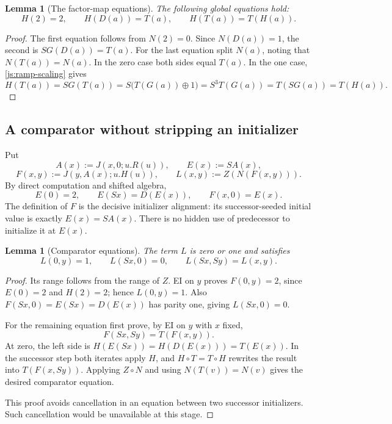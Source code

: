 \documentclass[11pt,letterpaper]{article}
\newtheorem{lemma}[theorem]{Lemma}
\theoremstyle{definition}\newtheorem{definition}[theorem]{Definition}
\theoremstyle{remark}\newtheorem{remark}[theorem]{Remark}
\begin{document}
\begin{lemma}[The factor-map equations]\label{js:factor}
The following global equations hold:
\[
 H(2)=2,\qquad H(D(a))=T(a),\qquad H(T(a))=T(H(a)).
 \tag{Factor}\label{js:factor-equations}
\]
\end{lemma}
\begin{proof}
The first equation follows from $N(2)=0$.  Since $N(D(a))=1$,
the second is $S G(D(a))=T(a)$.
For the last equation split $N(a)$, noting that $N(T(a))=N(a)$.
In the zero case both sides equal $T(a)$.  In the one case,
\eqref{js:ramp-scaling} gives
\[
 H(T(a))=S G(T(a))
 =S\bigl(T(G(a))\oplus1\bigr)
 =S^3T(G(a))=T(SG(a))=T(H(a)).
\]
\end{proof}

\subsection{A comparator without stripping an initializer}

Put
\[
 A(x):=J(x,0;u.R(u)),\qquad E(x):=S A(x),
\]
\[
 F(x,y):=J(y,A(x);u.H(u)),\qquad
 L(x,y):=Z(N(F(x,y))).
\]
By direct computation and shifted algebra,
\[
 E(0)=2,\qquad E(Sx)=D(E(x)),\qquad F(x,0)=E(x).
\]
The definition of $F$ is the decisive initializer alignment:
its successor-seeded initial value is exactly $E(x)=S A(x)$.
There is no hidden use of predecessor to initialize it at $E(x)$.

\begin{lemma}[Comparator equations]\label{js:comparator}
The term $L$ is zero or one and satisfies
\[
 L(0,y)=1,\qquad L(Sx,0)=0,\qquad
 L(Sx,Sy)=L(x,y).
 \tag{Comparator}\label{js:comparator-equations}
\]
\end{lemma}
\begin{proof}
Its range follows from the range of $Z$.  EI on $y$ proves
$F(0,y)=2$, since $E(0)=2$ and $H(2)=2$; hence $L(0,y)=1$.
Also $F(Sx,0)=E(Sx)=D(E(x))$ has parity one, giving
$L(Sx,0)=0$.

For the remaining equation first prove, by EI on $y$ with $x$ fixed,
\[
 F(Sx,Sy)=T(F(x,y)).
\]
At zero, the left side is
$H(E(Sx))=H(D(E(x)))=T(E(x))$.  In the successor step both
iterates apply $H$, and $H\circ T=T\circ H$ rewrites the result
into $T(F(x,Sy))$.  Applying $Z\circ N$ and using
$N(T(v))=N(v)$ gives the desired comparator equation.

This proof avoids cancellation in an equation between two successor
initializers.  Such cancellation would be unavailable at this stage.
\end{proof}
\end{document}
